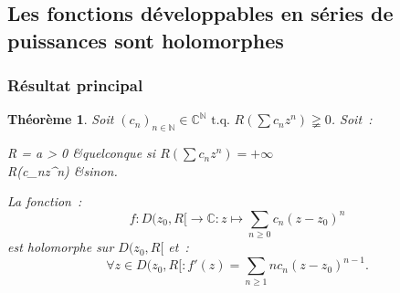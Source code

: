 \documentclass{report}
\newtheorem{thm}{Théorème}[chapter]
\theoremstyle{definition}
\theoremstyle{remark}
\numberwithin{equation}{section}
\newcommand{\C}{\mathbb C}
\newcommand{\N}{\mathbb N}
\newcommand{\tq}{\text{ t.q. }}
\newcommand{\pinfty}{{+\infty}}
\begin{document}
	\subsection{Les fonctions développables en séries de puissances sont holomorphes}
		\subsubsection{Résultat principal}
			\begin{thm} Soit $(c_n)_{n \in \N} \in \C^\N \tq R\left(\sum c_nz^n\right) \gneqq 0$.
			Soit~:
			\begin{subnumcases}
				{R = }
					a > 0 &quelconque si $R\left(\sum c_nz^n\right) = \pinfty$ \\
					R\left(\sum c_nz^n\right) &sinon.
			\end{subnumcases}

			La fonction~:
			\begin{equation}\label{eq:f DSP}
				f : D(z_0, R[ \to \C : z \mapsto \sum_{n \geq 0}c_n(z-z_0)^n
			\end{equation}
			est holomorphe sur $D(z_0, R[$ et~:
			\begin{equation}\label{eq:DSP => holomorphe}
				\forall z \in D(z_0, R[ : f'(z) = \sum_{n \geq 1}nc_n(z-z_0)^{n-1}.
			\end{equation}
			\end{thm}
\end{document}
